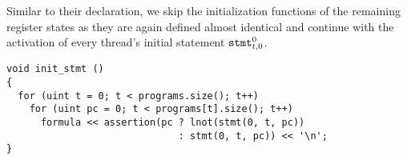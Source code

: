 





\noindent
Similar to their declaration, we skip the initialization functions of the remaining register states as they are again defined almost identical and continue with the activation of every thread's initial statement $\texttt{stmt}^0_{t, 0}$.
\begin{lstlisting}[style=c++]
void init_stmt ()
{
  for (uint t = 0; t < programs.size(); t++)
    for (uint pc = 0; t < programs[t].size(); t++)
      formula << assertion(pc ? lnot(stmt(0, t, pc))
                              : stmt(0, t, pc)) << '\n';
}
\end{lstlisting}

